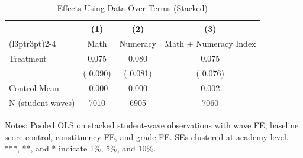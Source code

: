 \begin{table}[!htbp]
\centering
\caption{Effects Using Data Over Terms (Stacked)}
\label{tab:ng_over_terms}
\begin{threeparttable}
\begin{tabular}[t]{lccc}
\toprule
 & (1) & (2) & (3) \\
\cmidrule(l{3pt}r{3pt}){2-4}
 & Math & Numeracy & Math + Numeracy Index \\
\midrule
Treatment &   0.075 &   0.080 &   0.075 \\
 & (  0.090) & (  0.081) & (  0.076) \\
\addlinespace
Control Mean &  -0.000 &   0.000 &   0.002 \\
N (student-waves) & 7010 & 6905 & 7060 \\
\bottomrule
\end{tabular}
\begin{tablenotes}[para]
\item Notes: Pooled OLS on stacked student-wave observations with wave FE,
baseline score control, constituency FE, and grade FE.
SEs clustered at academy level. ***, **, and * indicate 1\%, 5\%, and 10\%.
\end{tablenotes}
\end{threeparttable}
\end{table}
